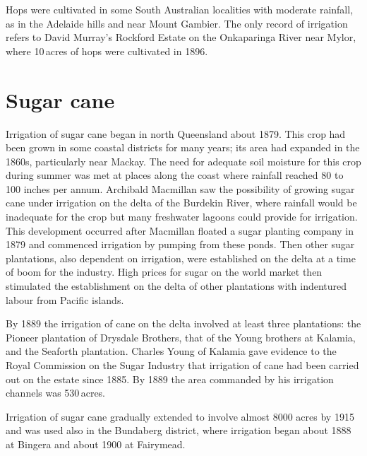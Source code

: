 Hops were cultivated in some South Australian localities with moderate
rainfall, as in the Adelaide hills and near Mount Gambier.  The only record of irrigation refers to David Murray's
Rockford Estate on the Onkaparinga River 
near Mylor,  where 10\,acres of hops were cultivated
in 1896.

\section*{Sugar cane} 

Irrigation of sugar cane began in north Queensland about 1879.  This
crop had been grown in some coastal districts for many years; its area
had expanded in the 1860s, particularly near Mackay.  The need for adequate soil moisture for this crop during summer
was met at places along the coast where rainfall reached 80 to 100
inches per annum.  Archibald Macmillan  saw the
possibility of growing sugar cane under irrigation on the delta of the
Burdekin River,  where rainfall would be
inadequate for the crop but many freshwater lagoons could provide for
irrigation.  This development occurred after Macmillan floated a sugar
planting company in 1879 and commenced irrigation by pumping from
these ponds.  Then other sugar plantations, also dependent on
irrigation, were established on the delta at a time of boom for the
industry.  High prices for sugar on the world market then stimulated
the establishment on the delta of other plantations with indentured
labour from Pacific islands.

By 1889 the irrigation of cane on the delta involved at least three
plantations: the Pioneer plantation of Drysdale Brothers,
 that of the
Young brothers at Kalamia,  and the Seaforth
plantation.  Charles Young  of Kalamia gave evidence
to the Royal Commission on the Sugar Industry that irrigation of cane
had been carried out on the estate since 1885. By 1889 the area
commanded by his irrigation channels was 530\,acres.

Irrigation of sugar cane gradually extended to involve almost 8000
acres by 1915 and was used also in the Bundaberg
 district, where
irrigation began about 1888 at Bingera  and about
1900 at Fairymead.

